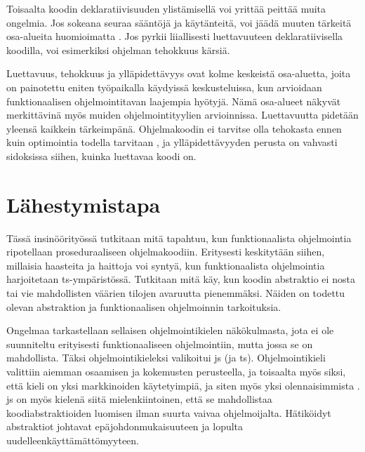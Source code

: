 Toisaalta koodin deklaratiivisuuden ylistämisellä voi yrittää peittää muita ongelmia. Jos sokeana seuraa sääntöjä ja käytänteitä, voi jäädä muuten tärkeitä osa-alueita huomioimatta \cite{functional_fixedness}. Jos pyrkii liiallisesti luettavuuteen deklaratiivisella koodilla, voi esimerkiksi ohjelman tehokkuus kärsiä.

Luettavuus, tehokkuus ja ylläpidettävyys ovat kolme keskeistä osa-aluetta, joita on painotettu eniten työpaikalla käydyissä keskusteluissa, kun arvioidaan funktionaalisen ohjelmointitavan laajempia hyötyjä. Nämä osa-alueet näkyvät merkittävinä myös muiden ohjelmointityylien arvioinnissa. Luettavuutta pidetään yleensä kaikkein tärkeimpänä. Ohjelmakoodin ei tarvitse olla tehokasta ennen kuin optimointia todella tarvitaan \cite{prematureoptimization}, ja ylläpidettävyyden perusta on vahvasti sidoksissa siihen, kuinka luettavaa koodi on.


\section{Lähestymistapa}

Tässä insinöörityössä tutkitaan mitä tapahtuu, kun funktionaalista ohjelmointia ripotellaan proseduraaliseen ohjelmakoodiin. Eritysesti keskitytään siihen, millaisia haasteita ja haittoja voi syntyä, kun funktionaalista ohjelmointia harjoitetaan \gls{ts}-ympäristössä. Tutkitaan mitä käy, kun koodin abstraktio ei nosta  tai vie mahdollisten väärien tilojen avaruutta pienemmäksi. Näiden on todettu olevan abstraktion ja funktionaalisen ohjelmoinnin tarkoituksia. \citep{dijkstra_humble_programmer,impossiblebetter}

Ongelmaa tarkastellaan sellaisen ohjelmointikielen näkökulmasta, jota ei ole suunniteltu erityisesti funktionaaliseen ohjelmointiin, mutta jossa se on mahdollista. Täksi ohjelmointikieleksi valikoitui \gls{js} (ja \gls{ts}). Ohjelmointikieli valittiin aiemman osaamisen ja kokemusten perusteella, ja toisaalta myös siksi, että kieli on yksi markkinoiden käytetyimpiä, ja siten myös yksi olennaisimmista \cite{pypl:lang}. \Gls{js} on myös kielenä siitä mielenkiintoinen, että se mahdollistaa koodiabstraktioiden luomisen ilman suurta vaivaa ohjelmoijalta. Hätiköidyt abstraktiot johtavat epäjohdonmukaisuuteen ja lopulta uudelleenkäyttämättömyyteen.

